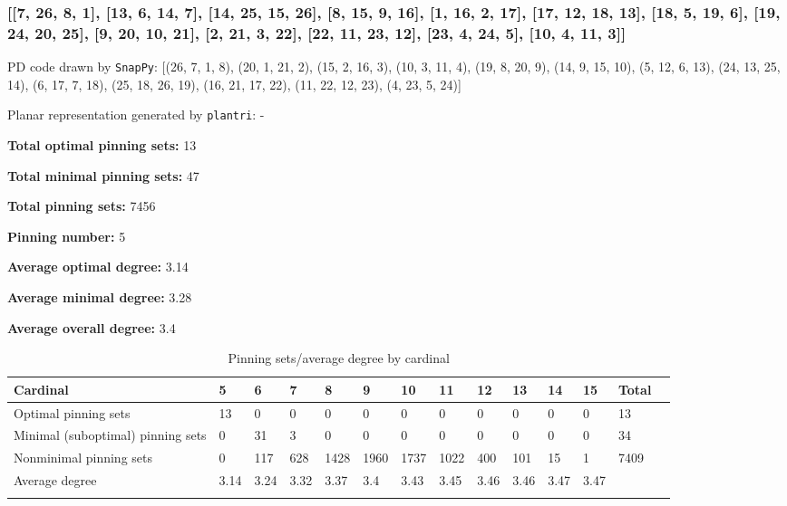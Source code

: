 \documentclass{article}%
\begin{document}
\newpage

\subsubsection{[[7, 26, 8, 1], [13, 6, 14, 7], [14, 25, 15, 26], [8, 15, 9, 16], [1, 16, 2, 17], [17, 12, 18, 13], [18, 5, 19, 6], [19, 24, 20, 25], [9, 20, 10, 21], [2, 21, 3, 22], [22, 11, 23, 12], [23, 4, 24, 5], [10, 4, 11, 3]]}

{\small\noindent PD code drawn by \texttt{SnapPy}: [(26, 7, 1, 8), (20, 1, 21, 2), (15, 2, 16, 3), (10, 3, 11, 4), (19, 8, 20, 9), (14, 9, 15, 10), (5, 12, 6, 13), (24, 13, 25, 14), (6, 17, 7, 18), (25, 18, 26, 19), (16, 21, 17, 22), (11, 22, 12, 23), (4, 23, 5, 24)]}

{\small\noindent Planar representation generated by \texttt{plantri}: -}

\begin{multicols}{2}
{\normalsize \noindent\textbf{Total optimal pinning sets:} 13

\noindent\textbf{Total minimal pinning sets:} 47

\noindent\textbf{Total pinning sets:} 7456

\noindent\textbf{Pinning number:} 5

}
\columnbreak

{\normalsize \noindent\textbf{Average optimal degree:} 3.14

\noindent\textbf{Average minimal degree:} 3.28

\noindent\textbf{Average overall degree:} 3.4

}
\end{multicols}

\begin{table}[ht]
	\caption{Pinning sets/average degree by cardinal}
	\centering
	\renewcommand{\arraystretch}{1.5}
	\begin{tabularx}{\textwidth}{lXXXXXXXXXXXXX}
		\toprule
			Cardinal & 5 & 6 & 7 & 8 & 9 & 10 & 11 & 12 & 13 & 14 & 15 & Total\\
			\hline
			Optimal pinning sets & 13 & 0 & 0 & 0 & 0 & 0 & 0 & 0 & 0 & 0 & 0 & 13 \\
			Minimal (suboptimal) pinning sets & 0 & 31 & 3 & 0 & 0 & 0 & 0 & 0 & 0 & 0 & 0 & 34 \\
			Nonminimal pinning sets & 0 & 117 & 628 & 1428 & 1960 & 1737 & 1022 & 400 & 101 & 15 & 1 & 7409 \\
			Average degree & 3.14 & 3.24 & 3.32 & 3.37 & 3.4 & 3.43 & 3.45 & 3.46 & 3.46 & 3.47 & 3.47 &  \\
		\bottomrule \\ 
	\end{tabularx}
\end{table}
\end{document}
